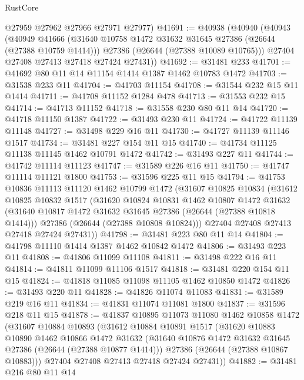 \begin{lexlean}{RustCore}
\begin{coremodule}
      @27959
      @27962
      @27966
      @27971
      @27977)
@41691 := @40938
    (@40940
      (@40943
        (@40949
          @41666
          (@31640 @10758 @1472 @31632 @31645 @27386 (@26644 (@27388 @10759 @1414)))
          @27386
          (@26644 (@27388 @10089 @10765)))
        @27404
        @27408
        @27413
        @27418
        @27424
        @27431))
@41692 := @31481 @233
@41701 := @41692 @80 @11 @14 @11154 @1414 @1387 @1462 @10783 @1472
@41703 := @31538 @233 @11
@41704 := @41703 @11154
@41708 := @31544 @232 @15 @11 @1414
@41711 := @41708 @11152 @1284 @478
@41713 := @31553 @232 @15
@41714 := @41713 @11152
@41718 := @31558 @230 @80 @11 @14
@41720 := @41718 @11150 @1387
@41722 := @31493 @230 @11
@41724 := @41722 @11139 @11148
@41727 := @31498 @229 @16 @11
@41730 := @41727 @11139 @11146 @1517
@41734 := @31481 @227 @154 @11 @15
@41740 := @41734 @11125 @11138 @11145 @1462 @10791 @1472
@41742 := @31493 @227 @11
@41744 := @41742 @11114 @11123
@41747 := @31589 @226 @16 @11
@41750 := @41747 @11114 @11121 @1800
@41753 := @31596 @225 @11 @15
@41794 := @41753
    @10836
    @11113
    @11120
    @1462
    @10799
    @1472
    (@31607
      @10825
      @10834
      (@31612
        @10825
        @10832
        @1517
        (@31620
          @10824
          @10831
          @1462
          @10807
          @1472
          @31632
          (@31640 @10817 @1472 @31632 @31645 @27386 (@26644 (@27388 @10818 @1414)))
          @27386
          (@26644 (@27388 @10808 @10824)))
        @27404
        @27408
        @27413
        @27418
        @27424
        @27431))
@41798 := @31481 @223 @80 @11 @14
@41804 := @41798 @11110 @1414 @1387 @1462 @10842 @1472
@41806 := @31493 @223 @11
@41808 := @41806 @11099 @11108
@41811 := @31498 @222 @16 @11
@41814 := @41811 @11099 @11106 @1517
@41818 := @31481 @220 @154 @11 @15
@41824 := @41818 @11085 @11098 @11105 @1462 @10850 @1472
@41826 := @31493 @220 @11
@41828 := @41826 @11074 @11083
@41831 := @31589 @219 @16 @11
@41834 := @41831 @11074 @11081 @1800
@41837 := @31596 @218 @11 @15
@41878 := @41837
    @10895
    @11073
    @11080
    @1462
    @10858
    @1472
    (@31607
      @10884
      @10893
      (@31612
        @10884
        @10891
        @1517
        (@31620
          @10883
          @10890
          @1462
          @10866
          @1472
          @31632
          (@31640 @10876 @1472 @31632 @31645 @27386 (@26644 (@27388 @10877 @1414)))
          @27386
          (@26644 (@27388 @10867 @10883)))
        @27404
        @27408
        @27413
        @27418
        @27424
        @27431))
@41882 := @31481 @216 @80 @11 @14

\end{coremodule}
\end{lexlean}
